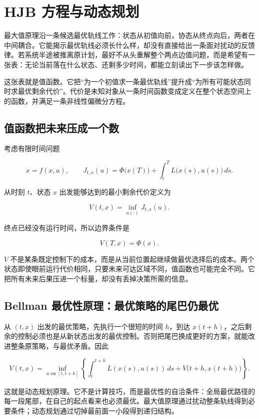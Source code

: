 \section{HJB 方程与动态规划}

最大值原理沿一条候选最优轨线工作：状态从初值向前，协态从终点向后，两者在中间耦合。它能揭示最优轨线必须长什么样，却没有直接给出一条面对扰动的反馈律。若系统半途被推离原计划，最好不从头重解整个两点边值问题，而是希望有一张表：无论当前落在什么状态、还剩多少时间，都能立刻读出下一步该怎样做。

这张表就是值函数。它把``为一个初值求一条最优轨线''提升成``为所有可能状态同时求最优剩余代价''。代价是未知对象从一条时间函数变成定义在整个状态空间上的函数，并满足一条非线性偏微分方程。

\subsection{值函数把未来压成一个数}

考虑有限时间问题

\[
\dot x=f(x,u),
\qquad
J_{t,x}(u)
=\Phi\bigl(x(T)\bigr)
+\int_t^T L\bigl(x(s),u(s)\bigr)\,ds.
\]

从时刻 \(t\)、状态 \(x\) 出发能够达到的最小剩余代价定义为

\[
V(t,x)=\inf_{u(\cdot)}J_{t,x}(u).
\]

终点已经没有运行时间，所以边界条件是

\[
V(T,x)=\Phi(x).
\]

\(V\) 不是某条既定控制下的成本，而是从当前位置起继续做最优选择后的成本。两个状态即使眼前运行代价相同，只要未来可达区域不同，值函数也可能完全不同。它把所有未来后果压进一个标量，却没有丢掉决策所需的信息。

\subsection{Bellman 最优性原理：最优策略的尾巴仍最优}

从 \((t,x)\) 出发的最优策略，先执行一个很短的时间 \(h\)，到达 \(x(t+h)\)，之后剩余的控制必须也是从新状态出发的最优控制。否则把尾巴换成更好的方案，就能改进整条原策略，与最优矛盾。因此

\[
V(t,x)
=
\inf_{u\text{ on }[t,t+h]}
\left\{
\int_t^{t+h}L(x(s),u(s))\,ds
+V\bigl(t+h,x(t+h)\bigr)
\right\}.
\]

这就是动态规划原理。它不是计算技巧，而是最优性的自洽条件：全局最优路径的每一段尾部，在自己的起点看来也必须最优。最大值原理通过扰动整条轨线得到必要条件；动态规划通过切掉最前面一小段得到递归结构。


